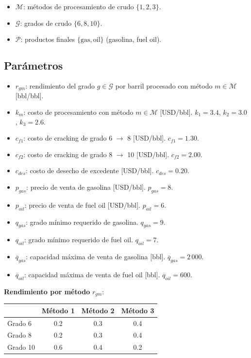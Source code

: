 \documentclass[12pt,a4paper]{article}
\begin{document}
\begin{conjbox}
\begin{itemize}[leftmargin=1.5em]
  \item $\mathcal{M}$: métodos de procesamiento de crudo $\{1, 2, 3\}$.
  \item $\mathcal{G}$: grados de crudo $\{6, 8, 10\}$.
  \item $\mathcal{P}$: productos finales $\{\text{gas}, \text{oil}\}$ (gasolina, fuel oil).
\end{itemize}
\end{conjbox}

\subsection{Parámetros}

\begin{parambox}
\begin{itemize}[leftmargin=1.5em]
  \item $r_{gm}$: rendimiento del grado $g \in \mathcal{G}$ por barril procesado con método $m \in \mathcal{M}$ [bbl/bbl].
  \item $k_m$: costo de procesamiento con método $m \in \mathcal{M}$ [USD/bbl]. $k_1=3.4$, $k_2=3.0$, $k_3=2.6$.
  \item $c_{f1}$: costo de cracking de grado 6 $\to$ 8 [USD/bbl]. $c_{f1} = 1.30$.
  \item $c_{f2}$: costo de cracking de grado 8 $\to$ 10 [USD/bbl]. $c_{f2} = 2.00$.
  \item $c_{des}$: costo de desecho de excedente [USD/bbl]. $c_{des} = 0.20$.
  \item $p_{gas}$: precio de venta de gasolina [USD/bbl]. $p_{gas} = 8$.
  \item $p_{oil}$: precio de venta de fuel oil [USD/bbl]. $p_{oil} = 6$.
  \item $q_{gas}$: grado mínimo requerido de gasolina. $q_{gas} = 9$.
  \item $q_{oil}$: grado mínimo requerido de fuel oil. $q_{oil} = 7$.
  \item $\overline{q}_{gas}$: capacidad máxima de venta de gasolina [bbl]. $\overline{q}_{gas} = 2\,000$.
  \item $\overline{q}_{oil}$: capacidad máxima de venta de fuel oil [bbl]. $\overline{q}_{oil} = 600$.
\end{itemize}

\medskip
\textbf{Rendimiento por método} $r_{gm}$:
\begin{center}
\begin{tabular}{@{}lccc@{}}
\toprule
& \textbf{Método 1} & \textbf{Método 2} & \textbf{Método 3}\\
\midrule
Grado 6  & 0.2 & 0.3 & 0.4\\
Grado 8  & 0.2 & 0.3 & 0.4\\
Grado 10 & 0.6 & 0.4 & 0.2\\
\bottomrule
\end{tabular}
\end{center}
\end{parambox}
\end{document}
